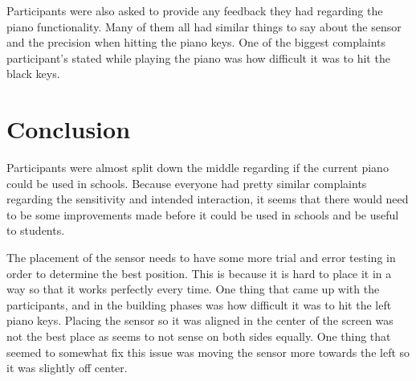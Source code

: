 \documentclass[sigconf,authordraft]{acmart}
\begin{document}
Participants were also asked to provide any feedback they had regarding the piano functionality.  Many of them all had similar things to say about the sensor and the precision when hitting the piano keys.  One of the biggest complaints participant's stated while playing the piano was how difficult it was to hit the black keys.

\section{Conclusion}
Participants were almost split down the middle regarding if the current piano could be used in schools.  Because everyone had pretty similar complaints regarding the sensitivity and intended interaction, it seems that there would need to be some improvements made before it could be used in schools and be useful to students.

The placement of the sensor needs to have some more trial and error testing in order to determine the best position.  This is because it is hard to place it in a way so that it works perfectly every time.  One thing that came up with the participants, and in the building phases was how difficult it was to hit the left piano keys.  Placing the sensor so it was aligned in the center of the screen was not the best place as seems to not sense on both sides equally.  One thing that seemed to somewhat fix this issue was moving the sensor more towards the left so it was slightly off center.




\appendix
\end{document}
